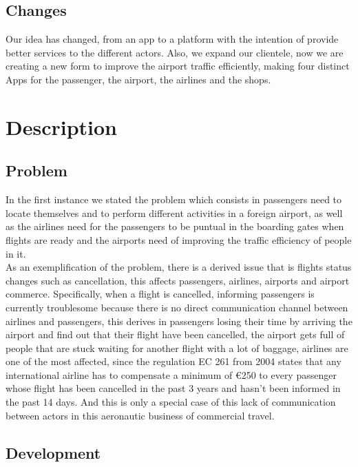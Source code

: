 \documentclass[12pt]{article}
\begin{document}
\subsection{Changes}
Our idea has changed, from an app to a platform with the intention of provide better services to the different actors. Also, we expand our clientele, now we are creating a new form to improve the airport traffic efficiently, making four distinct Apps for the passenger, the airport, the airlines and the shops.\\
[0.7cm]

\section{Description}

\subsection{Problem}

In the first instance we stated the problem which consists in passengers need to locate themselves and to perform different activities in a foreign airport, as well as the airlines need for the passengers to be puntual in the boarding gates when flights are ready and the airports need of improving the traffic efficiency of people in it.\\

As an exemplification of the problem, there is a derived issue that is flights status changes such as cancellation, this affects passengers, airlines, airports and airport commerce. Specifically, when a flight is cancelled, informing passengers is currently troublesome because there is no direct communication channel between airlines and passengers, this derives in passengers losing their time by arriving the airport and find out that their flight have been cancelled, the airport gets full of people that are stuck waiting for another flight with a lot of baggage, airlines are one of the most affected, since the regulation EC 261 from 2004 states that any international airline has to compensate a minimum of €250 to every passenger whose flight has been cancelled in the past 3 years and hasn't been informed in the past 14 days. And this is only a special case of this lack of communication between actors in this aeronautic business of commercial travel.\\

\subsection{Development}
\end{document}
